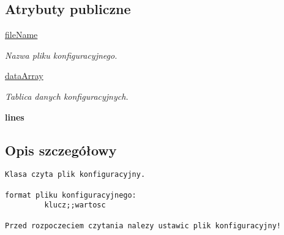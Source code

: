 \subsection*{Atrybuty publiczne}
\begin{CompactItemize}
\item 
\hypertarget{class_serv_1_1_config_reader_1_1_config_reader_3d369f91bd609f90e8eead22a7c829e0}{
\hyperlink{class_serv_1_1_config_reader_1_1_config_reader_3d369f91bd609f90e8eead22a7c829e0}{fileName}}
\label{class_serv_1_1_config_reader_1_1_config_reader_3d369f91bd609f90e8eead22a7c829e0}

\begin{CompactList}\small\item\em Nazwa pliku konfiguracyjnego. \item\end{CompactList}\item 
\hypertarget{class_serv_1_1_config_reader_1_1_config_reader_cf1f5f01f97b0d27a74c5466cf917a20}{
\hyperlink{class_serv_1_1_config_reader_1_1_config_reader_cf1f5f01f97b0d27a74c5466cf917a20}{dataArray}}
\label{class_serv_1_1_config_reader_1_1_config_reader_cf1f5f01f97b0d27a74c5466cf917a20}

\begin{CompactList}\small\item\em Tablica danych konfiguracyjnych. \item\end{CompactList}\item 
\hypertarget{class_serv_1_1_config_reader_1_1_config_reader_2bc23c7436c3b44766cca7db8a1674a0}{
\textbf{lines}}
\label{class_serv_1_1_config_reader_1_1_config_reader_2bc23c7436c3b44766cca7db8a1674a0}

\end{CompactItemize}


\subsection{Opis szczegółowy}


\footnotesize\begin{verbatim}
Klasa czyta plik konfiguracyjny.

format pliku konfiguracyjnego: 
         klucz;;wartosc         

Przed rozpoczeciem czytania nalezy ustawic plik konfiguracyjny!    
\end{verbatim}
\normalsize
 

